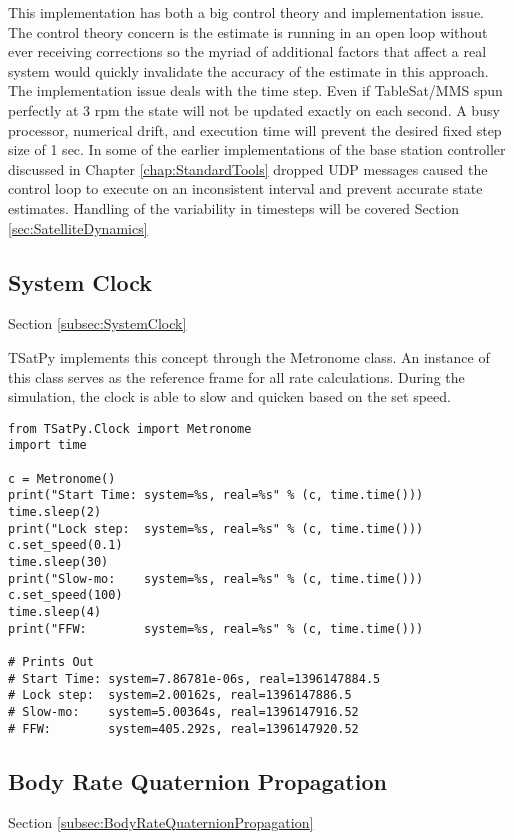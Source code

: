 This implementation has both a big control theory and implementation issue.  The control theory concern is the estimate is running in an open loop without ever receiving corrections so the myriad of additional factors that affect a real system would quickly invalidate the accuracy of the estimate in this approach.  The implementation issue deals with the time step.  Even if TableSat/MMS spun perfectly at 3 rpm the state will not be updated exactly on each second.  A busy processor, numerical drift, and execution time will prevent the desired fixed step size of 1 sec.  In some of the earlier implementations of the base station controller discussed in Chapter \ref{chap:StandardTools} dropped UDP messages caused the control loop to execute on an inconsistent interval and prevent accurate state estimates.  Handling of the variability in timesteps will be covered Section \ref{sec:SatelliteDynamics}

\subsection{System Clock}
\label{subsec:Implementation-SystemClock}

Section \ref{subsec:SystemClock}

TSatPy implements this concept through the Metronome class.  An instance of this class serves as the reference frame for all rate calculations.  During the simulation, the clock is able to slow and quicken based on the set speed.

\begin{singlespace}
  \begin{verbatim}
from TSatPy.Clock import Metronome
import time

c = Metronome()
print("Start Time: system=%s, real=%s" % (c, time.time()))
time.sleep(2)
print("Lock step:  system=%s, real=%s" % (c, time.time()))
c.set_speed(0.1)
time.sleep(30)
print("Slow-mo:    system=%s, real=%s" % (c, time.time()))
c.set_speed(100)
time.sleep(4)
print("FFW:        system=%s, real=%s" % (c, time.time()))

# Prints Out
# Start Time: system=7.86781e-06s, real=1396147884.5
# Lock step:  system=2.00162s, real=1396147886.5
# Slow-mo:    system=5.00364s, real=1396147916.52
# FFW:        system=405.292s, real=1396147920.52
  \end{verbatim}
  \nocite{minted}
\end{singlespace}

\subsection{Body Rate Quaternion Propagation}
\label{subsec:Implementation-BodyRateQuaternionPropagation}
Section \ref{subsec:BodyRateQuaternionPropagation}

